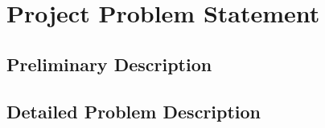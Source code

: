 \chapter{Project Problem Statement}
\section{Preliminary Description}
\section{Detailed Problem Description}